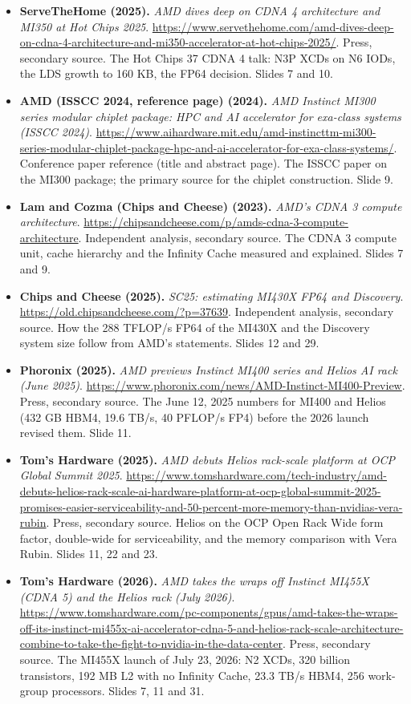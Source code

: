 \documentclass[11pt,letterpaper]{article}
\begin{document}
\begin{itemize}[leftmargin=1.2em,itemsep=3pt]
\item \textbf{ServeTheHome (2025).} \textit{AMD dives deep on CDNA 4 architecture and MI350 at Hot Chips 2025}. \url{https://www.servethehome.com/amd-dives-deep-on-cdna-4-architecture-and-mi350-accelerator-at-hot-chips-2025/}. Press, secondary source. The Hot Chips 37 CDNA 4 talk: N3P XCDs on N6 IODs, the LDS growth to 160 KB, the FP64 decision. Slides 7 and 10.
\item \textbf{AMD (ISSCC 2024, reference page) (2024).} \textit{AMD Instinct MI300 series modular chiplet package: HPC and AI accelerator for exa-class systems (ISSCC 2024)}. \url{https://www.aihardware.mit.edu/amd-instincttm-mi300-series-modular-chiplet-package-hpc-and-ai-accelerator-for-exa-class-systems/}. Conference paper reference (title and abstract page). The ISSCC paper on the MI300 package; the primary source for the chiplet construction. Slide 9.
\item \textbf{Lam and Cozma (Chips and Cheese) (2023).} \textit{AMD's CDNA 3 compute architecture}. \url{https://chipsandcheese.com/p/amds-cdna-3-compute-architecture}. Independent analysis, secondary source. The CDNA 3 compute unit, cache hierarchy and the Infinity Cache measured and explained. Slides 7 and 9.
\item \textbf{Chips and Cheese (2025).} \textit{SC25: estimating MI430X FP64 and Discovery}. \url{https://old.chipsandcheese.com/?p=37639}. Independent analysis, secondary source. How the 288 TFLOP/s FP64 of the MI430X and the Discovery system size follow from AMD's statements. Slides 12 and 29.
\item \textbf{Phoronix (2025).} \textit{AMD previews Instinct MI400 series and Helios AI rack (June 2025)}. \url{https://www.phoronix.com/news/AMD-Instinct-MI400-Preview}. Press, secondary source. The June 12, 2025 numbers for MI400 and Helios (432 GB HBM4, 19.6 TB/s, 40 PFLOP/s FP4) before the 2026 launch revised them. Slide 11.
\item \textbf{Tom's Hardware (2025).} \textit{AMD debuts Helios rack-scale platform at OCP Global Summit 2025}. \url{https://www.tomshardware.com/tech-industry/amd-debuts-helios-rack-scale-ai-hardware-platform-at-ocp-global-summit-2025-promises-easier-serviceability-and-50-percent-more-memory-than-nvidias-vera-rubin}. Press, secondary source. Helios on the OCP Open Rack Wide form factor, double-wide for serviceability, and the memory comparison with Vera Rubin. Slides 11, 22 and 23.
\item \textbf{Tom's Hardware (2026).} \textit{AMD takes the wraps off Instinct MI455X (CDNA 5) and the Helios rack (July 2026)}. \url{https://www.tomshardware.com/pc-components/gpus/amd-takes-the-wraps-off-its-instinct-mi455x-ai-accelerator-cdna-5-and-helios-rack-scale-architecture-combine-to-take-the-fight-to-nvidia-in-the-data-center}. Press, secondary source. The MI455X launch of July 23, 2026: N2 XCDs, 320 billion transistors, 192 MB L2 with no Infinity Cache, 23.3 TB/s HBM4, 256 work-group processors. Slides 7, 11 and 31.

\end{itemize}
\end{document}
